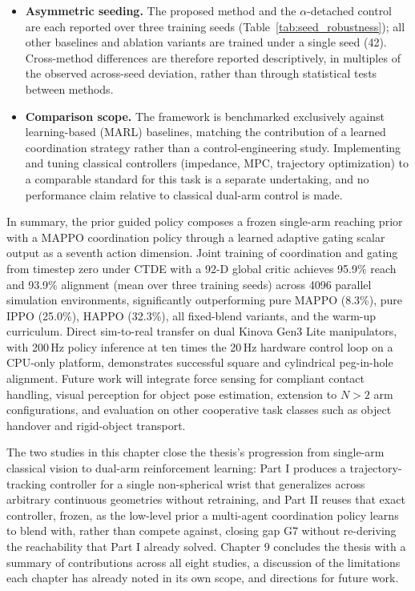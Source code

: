 \begin{itemize}
configuration of Table~\ref{tab:alpha_hyper}, as is common practice in recent MARL benchmarking, which
typically employs per-algorithm, per-task hyperparameter search~\citep{xie2026multi}. This avoids
favoring any single method through selective tuning, but the reported baseline performance may not
reflect each algorithm's individually optimal configuration; the training cost per run made an
independent per-algorithm search infeasible within the scope of this work.
\item \textbf{Asymmetric seeding.} The proposed method and the $\alpha$-detached control are each
reported over three training seeds (Table~\ref{tab:seed_robustness}); all other baselines and ablation
variants are trained under a single seed (42). Cross-method differences are therefore reported
descriptively, in multiples of the observed across-seed deviation, rather than through statistical
tests between methods.
\item \textbf{Comparison scope.} The framework is benchmarked exclusively against learning-based
(MARL) baselines, matching the contribution of a learned coordination strategy rather than a
control-engineering study. Implementing and tuning classical controllers (impedance, MPC, trajectory
optimization) to a comparable standard for this task is a separate undertaking, and no performance
claim relative to classical dual-arm control is made.
\end{itemize}

In summary, the prior guided policy composes a frozen single-arm reaching prior with a MAPPO coordination policy through
a learned adaptive gating scalar output as a seventh action dimension. Joint training of
coordination and gating from timestep zero under CTDE with a 92-D global critic achieves 95.9\%
reach and 93.9\% alignment (mean over three training seeds) across 4096 parallel simulation
environments, significantly outperforming pure MAPPO (8.3\%), pure IPPO (25.0\%), HAPPO (32.3\%), all
fixed-blend variants, and the warm-up curriculum. Direct sim-to-real transfer on dual Kinova Gen3 Lite
manipulators, with 200\,Hz policy inference at ten times the 20\,Hz hardware control loop on a
CPU-only platform, demonstrates successful square and cylindrical peg-in-hole alignment. Future work
will integrate force sensing for compliant contact handling, visual perception for object pose
estimation, extension to $N > 2$ arm configurations, and evaluation on other cooperative task classes
such as object handover and rigid-object transport.

The two studies in this chapter close the thesis's progression from single-arm classical vision to
dual-arm reinforcement learning: Part I produces a trajectory-tracking controller for a single
non-spherical wrist that generalizes across arbitrary continuous geometries without retraining, and
Part II reuses that exact controller, frozen, as the low-level prior a multi-agent coordination
policy learns to blend with, rather than compete against, closing gap G7 without re-deriving the
reachability that Part I already solved. Chapter 9 concludes the thesis with a summary of
contributions across all eight studies, a discussion of the limitations each chapter has already
noted in its own scope, and directions for future work.

